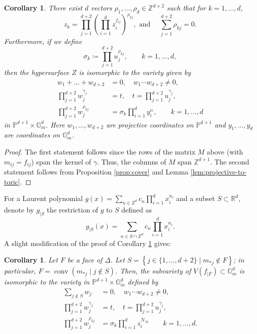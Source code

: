 \documentclass[11pt, reqno]{amsart}
\theoremstyle{plain}
\newtheorem{corol}[theo]{Corollary}
\theoremstyle{definition}
\newcommand{\Z}{\mathbb{Z}}
\newcommand{\R}{\mathbb{R}}
\newcommand{\ga}{\gamma}
\newcommand{\G}{\mathbb{G}}
\begin{document}
\begin{corol}\label{cor:cover1}
There exist $d$ vectors $\rho_1,\dots,\rho_d \in \mathbb{Z}^{d+2}$ such that for $k=1,\dots,d$,
\[
z_k = \prod_{j=1}^{d+2} \left( \prod_{i=1}^d z_i^{f_{ij}} \right) ^{\rho_{kj}}, \text{ and }  \quad \sum_{j=1}^{d+2} \rho_{kj}=0 .\]
Furthermore, if we define
\[
\sigma_k \coloneqq \prod_{j=1}^{d+2} u_j^{\rho_{kj}}, \qquad k=1,\dots, d,
\] then the hypersurface $Z$ is isomorphic to the variety given by
\begin{align*}
    w_1+\dots +w_{d+2} &= 0, \quad w_1\cdots w_{d+2} \neq 0,\\
    \prod_{j=1}^{d+2} w_j^{\gamma_j} &= t, \quad  t=\prod_{j=1}^{d+2}u_j^{\gamma_j},\\
    \prod_{j=1}^{d+2} w_j^{\rho_{kj}} &= \sigma_k \prod_{i=1}^d y_i^{_{ki}},    \qquad k=1,\dots,d 
\end{align*}
in $\mathbb{P}^{d+1} \times \G_m^{d}$.  Here $w_1,\dots,w_{d+2}$ are projective coordinates on $\mathbb{P}^{d+1}$ and $y_1,\dots ,y_{d}$ are coordinates on $\G_m^{d}$.
\end{corol}
\begin{proof}
    The first statement follows since the rows of the matrix $M$ above (with $m_{ij}=f_{ij}$) span the kernel of $\ga$. Thus, the columns of  $M$ span $\Z^{d+1}$.
    The second statement follows from Proposition \ref{prop:cover} and Lemma \ref{lem:projective-to-toric}. 
\end{proof}
For a Laurent polynomial $g(x)= \sum_{n \in \Z^{d}} c_{n} \prod_{i=1}^{d} x_i^{n_i}$ and a subset $S \subset \R^d$,  denote by  $g_{|S}$ the restriction of $g$ to $S$ defined as  
\[
g_{|S}(x)= \sum_{n\in S\cap \Z^{d}} c_{n} \prod_{i=1}^{d} x_i^{n_i}.
\]
A slight modification of the proof of Corollary \ref{cor:cover1} gives:
\begin{corol}\label{cor:cover}
Let $F$ be a face of $\Delta$. Let $S= \left\{ j \in \{1,\dots, d+2\} \mid m_{*j} \notin F \right\}$; in particular, $ F= \operatorname{conv}( m_{*j} \mid j \notin S )$.  Then, the subvariety of $V(f_{|F}) \subset \G_m^{d}$ is isomorphic to the variety in $\mathbb{P}^{d+1} \times \G_m^{d}$ defined by
\begin{align*}
   \sum_{j\notin S} w_j&= 0, \quad  w_1\cdots w_{d+2} \neq 0,\\
    \prod_{j=1}^{d+2} w_j^{\gamma_j} &=t, \quad  t=\prod_{j=1}^{d+2}u_j^{\gamma_j},\\
    \prod_{j=1}^{d+2} w_j^{\rho_{kj}} &=  \sigma_k \prod_{i=1}^d z_i^{\mathcal{N}_{ki}}  \qquad k=1,\dots,d.
\end{align*}
\end{corol}
\end{document}
